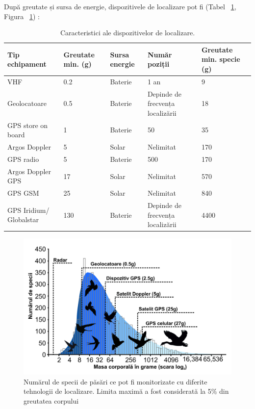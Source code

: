 \documentclass[11pt,onehalfspacing]{elife}
\begin{document}
După greutate și sursa de energie, dispozitivele de localizare pot fi (Tabel ~\ref{tab:1}, Figura ~\ref{fig7}) \citep{Thomas2012}:
\begin{table}[h!]
\caption{\label{tab:1}Caracteristici ale dispozitivelor de localizare.}
\begin{tabular}{ m{3cm}  m{2cm}  m{1.8cm}  m{4cm}  m{3cm} }
\midrule
\textbf{Tip echipament} & \textbf{Greutate min. (g)} & \textbf{Sursa energie} &	\textbf{Număr poziții} &	\textbf{Greutate min. specie (g)}\\
\midrule
VHF & 0.2 &	Baterie	& 1 an & 9\\
Geolocatoare & 0.5 & Baterie	& Depinde de frecvența localizării & 18\\
GPS store on board & 1 & Baterie	& 50 & 35\\
Argos Doppler & 5 & Solar & Nelimitat & 170\\
GPS radio & 5 & Baterie & 500 & 170\\
Argos Doppler GPS & 17 & Solar & Nelimitat & 570\\
GPS GSM & 25 & Solar & Nelimitat & 840\\
GPS Iridium/ Globalstar & 130 & Baterie & Depinde de frecvența localizării & 4400\\
\midrule
\end{tabular}
\end{table}
\begin{figure}[ht]
\includegraphics[width=\textwidth]{Fig7.jpg}
\caption{Numărul de specii de păsări ce pot fi monitorizate cu diferite tehnologii de localizare. Limita maximă a fost considerată la 5\% din greutatea corpului \citep{Bridge2011}} \label{fig7}
\end{figure}
\end{document}
